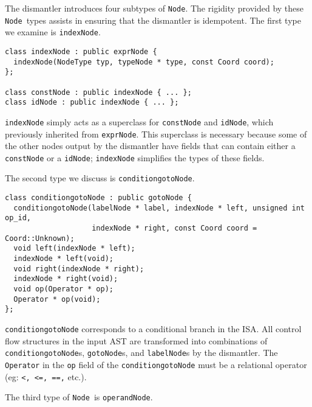 \documentclass{article}
\newcommand{\node}{\texttt{Node}}
\begin{document}
The dismantler introduces four subtypes of \node.  The rigidity
provided by these \node\ types assists in ensuring that the dismantler
is idempotent.  The first type we examine is \texttt{indexNode}.

\begin{verbatim}
class indexNode : public exprNode {
  indexNode(NodeType typ, typeNode * type, const Coord coord);
};

class constNode : public indexNode { ... };
class idNode : public indexNode { ... };
\end{verbatim}

\texttt{indexNode} simply acts as a superclass for \texttt{constNode}
and \texttt{idNode}, which previously inherited from
\texttt{exprNode}.  This superclass is necessary because some of the 
other nodes output by the dismantler have fields that can contain either a 
\texttt{constNode} or a \texttt{idNode};  \texttt{indexNode} simplifies
the types of these fields.

The second type we discuss is \texttt{conditiongotoNode}.

\begin{verbatim}
class conditiongotoNode : public gotoNode {
  conditiongotoNode(labelNode * label, indexNode * left, unsigned int op_id,
                    indexNode * right, const Coord coord = Coord::Unknown);
  void left(indexNode * left);
  indexNode * left(void);
  void right(indexNode * right);
  indexNode * right(void);
  void op(Operator * op);
  Operator * op(void);
};
\end{verbatim}

\texttt{conditiongotoNode} corresponds to a conditional branch in the ISA.
All control flow structures in the input AST are transformed into
combinations of \texttt{conditiongotoNode}s, \texttt{gotoNode}s, and
\texttt{labelNode}s by the dismantler.  The \texttt{Operator} in the
\texttt{op} field of the \texttt{conditiongotoNode} must be a relational
operator (eg: \texttt{<, <=, ==,} etc.).

The third type of \node\ is \texttt{operandNode}.
\end{document}
